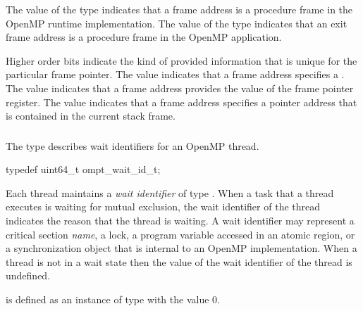 \descr
The value  of the  type
indicates that a frame address is a procedure frame in the OpenMP runtime 
implementation. The value  of the 
 type indicates that an exit frame address is a 
procedure frame in the OpenMP application.

Higher order bits indicate the kind of provided information that is unique
for the particular frame pointer. The value  indicates 
that a frame address specifies a . The value 
 indicates that a frame address provides the 
value of the frame pointer register. The value  
indicates that a frame address specifies a pointer address that is
contained in the current stack frame.





\subsubsection{}
\label{sec:ompt_wait_id_t}

\summary
The  type describes wait identifiers for an OpenMP thread.

\format
\begin{ccppspecific}
\begin{omptOther}
typedef uint64_t ompt_wait_id_t;
\end{omptOther}
\end{ccppspecific}

\descr
Each thread maintains a \emph{wait identifier} of type . 
When a task that a thread executes is waiting for mutual exclusion, the wait 
identifier of the thread indicates the reason that the thread is waiting. A 
wait identifier may represent a critical section {\em name}, a lock, a program 
variable accessed in an atomic region, or a synchronization object that is 
internal to an OpenMP implementation. When a thread is not in a wait state
then the value of the wait identifier of the thread is undefined.

 is defined as an instance of type 
 with the value 0.
